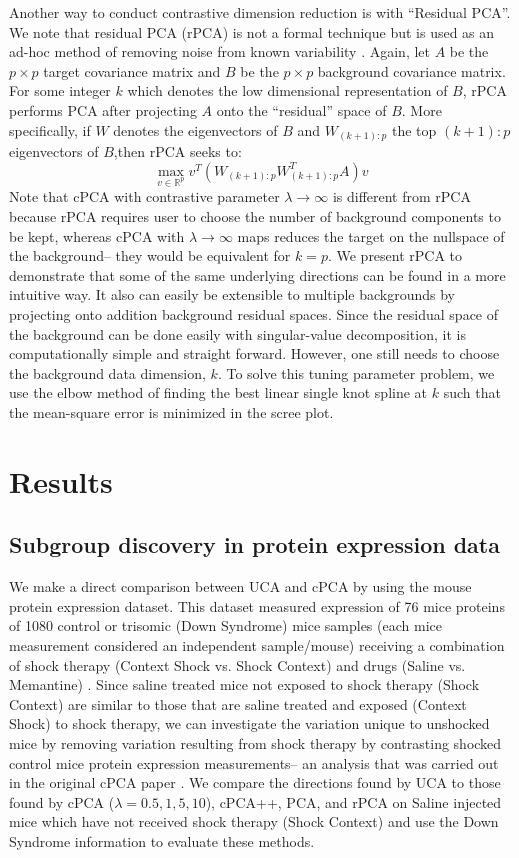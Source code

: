 \documentclass[12pt]{article}
\begin{document}
Another way to conduct contrastive dimension reduction is with ``Residual PCA''. We note that residual PCA (rPCA) is not a formal technique but is used as an ad-hoc method of removing noise from known variability  \cite{rpca}. Again, let $A$ be the $p \times p$ target covariance matrix and $B$ be the $p\times p$ background covariance matrix.  For some integer $k$ which denotes the low dimensional representation of $B$, rPCA performs PCA after projecting $A$ onto the ``residual'' space of $B$. More specifically, if $W$ denotes the eigenvectors of $B$ and $W_{(k+1):p}$ the top $(k+1):p$ eigenvectors of $B$,then rPCA seeks to:
\[\max_{v\in \mathbb{R}^p}{v^T \left(W_{(k+1):p}W_{(k+1):p}^T A\right) v}\]
Note that cPCA with contrastive parameter $\lambda \rightarrow \infty$ is different from rPCA because rPCA requires user to choose the number of background components to be kept, whereas cPCA with $\lambda \rightarrow \infty$ maps reduces the target on the nullspace of the background-- they would be equivalent for $k = p$. We present rPCA to demonstrate that some of the same underlying directions can be found in a more intuitive way. It also can easily be extensible to multiple backgrounds by projecting onto addition background residual spaces. Since the residual space of the background can be done easily with singular-value decomposition, it is computationally simple and straight forward. However, one still needs to choose the background data dimension, $k$.
To solve this tuning parameter problem, we use the elbow method of finding the best linear single knot spline at $k$ such that the mean-square error is minimized in the scree plot.%
   
   
   
\section{Results}
\subsection{Subgroup discovery in protein expression data}
We make a direct comparison between UCA and cPCA by using the mouse protein expression dataset. This dataset measured expression of 76 mice proteins of 1080 control or trisomic (Down Syndrome) mice samples (each mice measurement considered an independent sample/mouse) receiving a combination of shock therapy (Context Shock vs. Shock Context) and drugs (Saline vs. Memantine)  \cite{Ahmed, Higuera, Abid}.  
Since saline treated mice not exposed to shock therapy (Shock Context) are similar to those that are saline treated and exposed (Context Shock) to shock therapy, we can investigate the variation unique to unshocked mice by removing variation resulting from shock therapy by contrasting shocked control mice protein expression measurements-- an analysis that was carried out in the original cPCA paper  \cite{Abid}. 
We compare the directions found by UCA to those found by cPCA ($\lambda = 0.5, 1, 5, 10$), cPCA++, PCA, and rPCA on Saline injected mice which have not received shock therapy (Shock Context) and use the Down Syndrome information to evaluate these methods.
\end{document}
